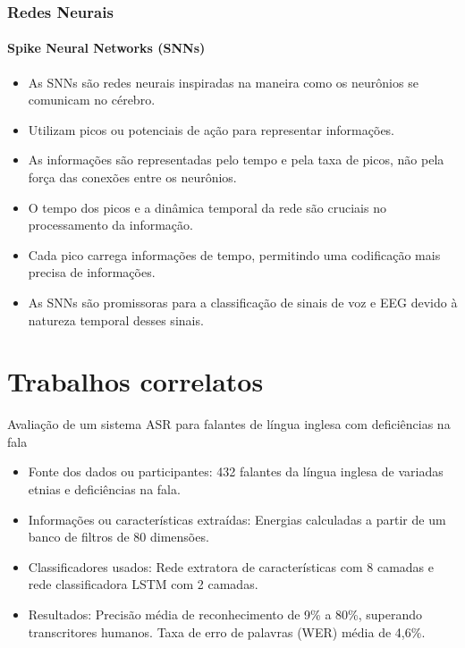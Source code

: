 \documentclass[aspectratio=169]{beamer}
\begin{document}
	\begin{frame}
		\frametitle{Redes Neurais}
		\framesubtitle{Spike Neural Networks (SNNs)}
		\begin{itemize}
			\item As SNNs são redes neurais inspiradas na maneira como os neurônios se comunicam no cérebro.
			\item Utilizam picos ou potenciais de ação para representar informações.
			\item As informações são representadas pelo tempo e pela taxa de picos, não pela força das conexões entre os neurônios.
			\item O tempo dos picos e a dinâmica temporal da rede são cruciais no processamento da informação.
			\item Cada pico carrega informações de tempo, permitindo uma codificação mais precisa de informações.
			\item As SNNs são promissoras para a classificação de sinais de voz e EEG devido à natureza temporal desses sinais.
		\end{itemize}
	\end{frame}

	\section{Trabalhos correlatos}
	
	\begin{frame}{Avaliação de um sistema ASR para falantes de língua inglesa com deficiências na fala \cite{WOS:000841879504172}}
		\begin{itemize}
			\item Fonte dos dados ou participantes: 432 falantes da língua inglesa de variadas etnias e deficiências na fala.
			\item Informações ou características extraídas: Energias calculadas a partir de um banco de filtros de 80 dimensões.
			\item Classificadores usados: Rede extratora de características com 8 camadas e rede classificadora LSTM com 2 camadas.
			\item Resultados: Precisão média de reconhecimento de 9\% a 80\%, superando transcritores humanos. Taxa de erro de palavras (WER) média de 4,6\%.
		\end{itemize}
		
	\end{frame}
\end{document}
